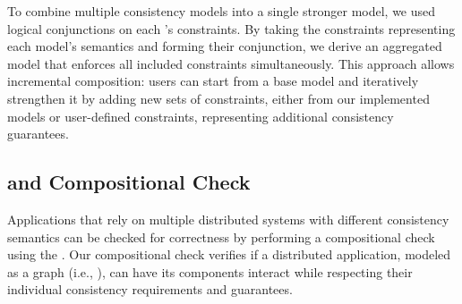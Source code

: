 To combine multiple consistency models into a single stronger model, we used
logical conjunctions on each \sysmod{}'s constraints. By taking the constraints
representing each model's semantics and forming their conjunction, we derive an
aggregated model that enforces all included constraints simultaneously.
This approach allows incremental composition: users can start from a
base model and iteratively strengthen it by adding new sets of constraints,
either from our implemented models or user-defined constraints, representing
additional consistency guarantees.

\subsection{\sysgraph{} and Compositional Check}

Applications that rely on multiple distributed systems with different
consistency semantics can be checked for correctness by performing a
compositional check using the \sysgraph{}.
Our compositional check
verifies if a distributed application, modeled as a graph (i.e.,
\sysgraph{}), can have its components interact while
respecting their individual consistency requirements and guarantees.



